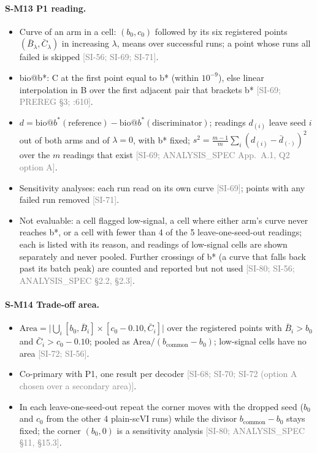 \documentclass[11pt]{article}
\newcommand{\src}[1]{{\scriptsize\textcolor{gray}{[#1]}}}
\begin{document}
\paragraph{S-M13 P1 reading.}
\begin{itemize}
\item Curve of an arm in a cell: $(b_0, c_0)$ followed by its six registered points $(\bar B_\lambda, \bar C_\lambda)$ in increasing $\lambda$, means over successful runs; a point whose runs all failed is skipped \src{SI-56; SI-69; SI-71}.
\item bio@b*: C at the first point equal to b* (within $10^{-9}$), else linear interpolation in B over the first adjacent pair that brackets b* \src{SI-69; PREREG \S3; :610}.
\item $d = \mathrm{bio@}b^*(\text{reference}) - \mathrm{bio@}b^*(\text{discriminator})$; readings $d_{(i)}$ leave seed $i$ out of both arms and of $\lambda = 0$, with b* fixed; $s^2 = \frac{m-1}{m}\sum_i (d_{(i)} - \bar d_{(\cdot)})^2$ over the $m$ readings that exist \src{SI-69; ANALYSIS\_SPEC App.~A.1, Q2 option A}.
\item Sensitivity analyses: each run read on its own curve \src{SI-69}; points with any failed run removed \src{SI-71}.
\item Not evaluable: a cell flagged low-signal, a cell where either arm's curve never reaches b*, or a cell with fewer than 4 of the 5 leave-one-seed-out readings; each is listed with its reason, and readings of low-signal cells are shown separately and never pooled. Further crossings of b* (a curve that falls back past its batch peak) are counted and reported but not used \src{SI-80; SI-56; ANALYSIS\_SPEC \S2.2, \S2.3}.
\end{itemize}
\paragraph{S-M14 Trade-off area.}
\begin{itemize}
\item $\mathrm{Area} = \bigl|\bigcup_i [b_0, \bar B_i] \times [c_0 - 0.10, \bar C_i]\bigr|$ over the registered points with $\bar B_i > b_0$ and $\bar C_i > c_0 - 0.10$; pooled as $\mathrm{Area}/(b_{\mathrm{common}} - b_0)$; low-signal cells have no area \src{SI-72; SI-56}.
\item Co-primary with P1, one result per decoder \src{SI-68; SI-70; SI-72 (option A chosen over a secondary area)}.
\item In each leave-one-seed-out repeat the corner moves with the dropped seed ($b_0$ and $c_0$ from the other 4 plain-scVI runs) while the divisor $b_{\mathrm{common}} - b_0$ stays fixed; the corner $(b_0, 0)$ is a sensitivity analysis \src{SI-80; ANALYSIS\_SPEC \S11, \S15.3}.
\end{itemize}
\end{document}
